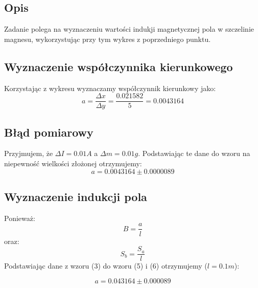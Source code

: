 \documentclass{article} %
\begin{document}
\subsection{Opis}

Zadanie polega na wyznaczeniu wartości indukji magnetycznej pola w szczelinie magnesu, wykorzystując przy tym wykres z poprzedniego punktu.

\subsection{Wyznaczenie współczynnika kierunkowego}

Korzystając z wykresu wyznaczamy współczynnik kierunkowy jako:
{\large
\begin{equation}
    a= \frac{\Delta x}{\Delta y} = \frac{0.021582}{5} = 0.0043164
\end{equation}
}
\subsection{Błąd pomiarowy}
Przyjmujem, że $\Delta I = 0.01A$ a $\Delta m = 0.01g$. Podstawiając te dane do wzoru na niepewność wielkości złożonej otrzymujemy:
{\large
\begin{equation}
    a = 0.0043164\pm 0.0000089
\end{equation}
}
\subsection{Wyznaczenie indukcji pola}
Ponieważ:
{\large
\begin{equation}
    B = \frac{a}{l}
\end{equation}
}
oraz:
{\large
\begin{equation}
    S_b = \frac{S_a}{l}
\end{equation}
}
Podstawiając dane z wzoru (3) do wzoru (5) i (6) otrzymujemy ($l = 0.1m$):

{\large
\begin{equation}
    a = 0.043164\pm0.000089
\end{equation}
}
\end{document}

